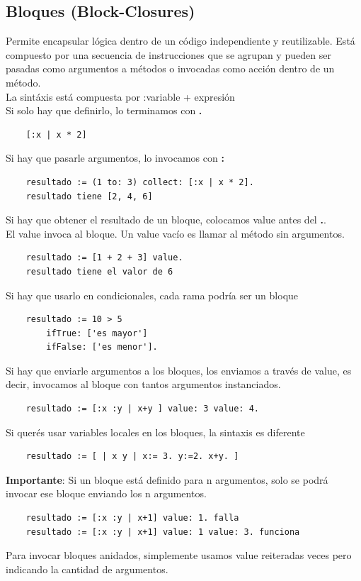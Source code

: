 \documentclass[10pt,a4paper]{article}
\begin{document}
\subsection*{Bloques (Block-Closures)}
Permite encapsular lógica dentro de un código independiente y reutilizable. Está compuesto por una secuencia de instrucciones que se agrupan y pueden ser pasadas como argumentos a métodos o invocadas como acción dentro de un método. \\
La sintáxis está compuesta por :variable + expresión \\
Si solo hay que definirlo, lo terminamos con \textbf{.}
\begin{lstlisting}
    [:x | x * 2]
\end{lstlisting}
Si hay que pasarle argumentos, lo invocamos con \textbf{:}
\begin{lstlisting}
    resultado := (1 to: 3) collect: [:x | x * 2].
    resultado tiene [2, 4, 6]
\end{lstlisting}
Si hay que obtener el resultado de un bloque, colocamos value antes del \textbf{.}. \\
El value invoca al bloque. Un value vacío es llamar al método sin argumentos.
\begin{lstlisting}
    resultado := [1 + 2 + 3] value. 
    resultado tiene el valor de 6
\end{lstlisting}
Si hay que usarlo en condicionales, cada rama podría ser un bloque 
\begin{lstlisting}
    resultado := 10 > 5 
        ifTrue: ['es mayor']
        ifFalse: ['es menor'].
\end{lstlisting}
Si hay que enviarle argumentos a los bloques, los enviamos a través de value, es decir, invocamos al bloque con tantos argumentos instanciados.
\begin{lstlisting}
    resultado := [:x :y | x+y ] value: 3 value: 4.
\end{lstlisting} 
Si querés usar variables locales en los bloques, la sintaxis es diferente 
\begin{lstlisting}
    resultado := [ | x y | x:= 3. y:=2. x+y. ]
\end{lstlisting}
\textbf{Importante}: Si un bloque está definido para n argumentos, solo se podrá invocar ese bloque enviando los n argumentos.
\begin{lstlisting}
    resultado := [:x :y | x+1] value: 1. falla 
    resultado := [:x :y | x+1] value: 1 value: 3. funciona
\end{lstlisting}
Para invocar bloques anidados, simplemente usamos value reiteradas veces pero indicando la cantidad de argumentos.
\end{document}
